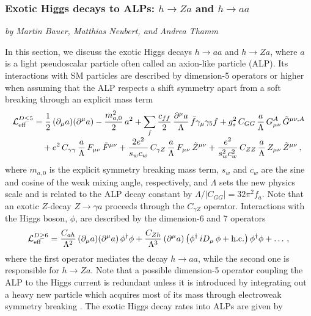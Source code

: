 \subsubsection{Exotic Higgs decays to ALPs: $h \to Za$ and $h \to aa$}
\begin{center}
{\it{ by Martin Bauer, Matthias Neubert, and Andrea Thamm}}
\end{center}


In this section, we discuss the exotic Higgs decays $h\to aa$ and $h\to Za$, where $a$ is a light pseudoscalar particle often called an axion-like particle (ALP). Its interactions with SM particles are described by dimension-5 operators or higher when assuming that the ALP respects a shift symmetry apart from a soft breaking through an explicit mass term \cite{Georgi:1986df} 
%
\begin{equation}\label{Leff}
\begin{aligned}
   {\cal L}_{\rm eff}^{D\le 5}
   &= \frac12 \left( \partial_\mu a\right)\!\left( \partial^\mu a\right)
    - \frac{m_{a,0}^2}{2}\,a^2 
    + \sum_f \frac{c_{ff}}{2}\,\frac{\partial^\mu a}{\Lambda}\,\bar f\gamma_\mu\gamma_5 f  + g_s^2\,C_{GG}\,\frac{a}{\Lambda}\,G_{\mu\nu}^A\,\tilde G^{\mu\nu,A} \\[-1mm]
   &\quad\mbox{}+ e^2\,C_{\gamma\gamma}\,\frac{a}{\Lambda}\,F_{\mu\nu}\,\tilde F^{\mu\nu}
    + \frac{2e^2}{s_w c_w}\,C_{\gamma Z}\,\frac{a}{\Lambda}\,F_{\mu\nu}\,\tilde Z^{\mu\nu}
    + \frac{e^2}{s_w^2 c_w^2}\,C_{ZZ}\,\frac{a}{\Lambda}\,Z_{\mu\nu}\,\tilde Z^{\mu\nu} \,,
\end{aligned}
\end{equation}
%
where $m_{a,0}$ is the explicit symmetry breaking mass term, $s_w$ and $c_w$ are the sine and cosine of the weak mixing angle, respectively, and $\Lambda$ sets the new physics scale and is related to the ALP decay constant by $\Lambda/|C_{GG}| = 32 \pi^2 f_a$. Note that an exotic $Z$-decay $Z\to\gamma a$ proceeds through the $C_{\gamma Z}$ operator.  Interactions with the Higgs boson, $\phi$, are described by the dimension-6 and 7 operators
%
\begin{equation}\label{LeffD>5}
   {\cal L}_{\rm eff}^{D\ge 6}
   = \frac{C_{ah}}{\Lambda^2} \left( \partial_\mu a\right)\!\left( \partial^\mu a\right) \phi^\dagger\phi
    + \frac{C_{Zh}}{\Lambda^3} \left( \partial^\mu a\right) 
    \left( \phi^\dagger\,iD_\mu\,\phi + \mbox{h.c.} \right) \phi^\dagger\phi + \dots  \,,
\end{equation}
%
where the first operator mediates the decay $h\to aa$, while the second one is responsible for $h\to Za$. Note that a possible dimension-5 operator coupling the ALP to the Higgs current is redundant unless it is introduced by integrating out a heavy new particle which acquires most of its mass through electroweak symmetry breaking \cite{Bauer:2016ydr,Bauer:2016zfj,Bauer:2017nlg,Bauer:2017ris}. The exotic Higgs decay rates into ALPs are given by  
